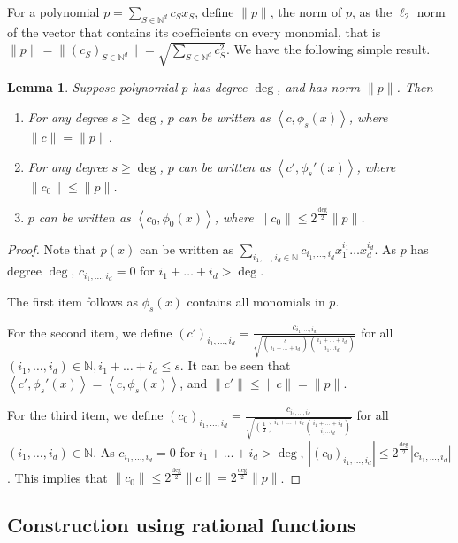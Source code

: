 \documentclass{article}
\newcommand{\field}[1]{\mathbb{#1}}
\newcommand{\fN}{\field{N}}
\newcommand{\inner}[1]{ \left\langle {#1} \right\rangle }
\newtheorem{lemma}[theorem]{Lemma}
\begin{document}
For a polynomial $p = \sum_{S \in \fN^d} c_S x_S$, define $\|p\|$, the norm of $p$, as the $\ell_2$ norm of the vector that contains its coefficients on every monomial, that is $\|p\| = \| (c_S)_{S \in \fN^d} \| = \sqrt{\sum_{S \in \fN^d} c_S^2}$. We have the following simple result.
\begin{lemma}
Suppose polynomial $p$ has degree $\deg$, and has norm $\|p\|$. Then
\begin{enumerate}
\item For any degree $s \geq \deg$, $p$ can be written as $\inner{c, \phi_s(x)}$, where $\|c\| = \|p\|$.
\item For any degree $s \geq \deg$, $p$ can be written as $\inner{c', \phi_s'(x)}$, where $\|c_0\| \leq \|p\|$.
\item $p$ can be written as $\inner{c_0, \phi_0(x)}$, where $\|c_0\| \leq 2^{\frac{\deg}{2}} \|p\|$.
\end{enumerate}
\end{lemma}
\begin{proof}
Note that $p(x)$ can be written as $\sum_{i_1,\ldots,i_d \in \fN} c_{i_1,\ldots,i_d} x_1^{i_1} \ldots x_d^{i_d}$. As $p$ has degree $\deg$, $c_{i_1,\ldots,i_d} = 0$ for $i_1 + \ldots + i_d > \deg$.

The first item follows as $\phi_s(x)$ contains all monomials in $p$.

For the second item, we define $(c')_{i_1,\ldots,i_d} = \frac{c_{i_1,\ldots,i_d}}{\sqrt{ {s \choose i_1+\ldots+i_d} {i_1+\ldots+i_d \choose i_1 \ldots i_d}}}$ for all $(i_1,\ldots,i_d) \in \fN, i_1+\ldots+i_d \leq s$. It can be seen that $\inner{c', \phi_s'(x)} = \inner{c, \phi_s(x)}$, and
$\| c' \| \leq \| c \| = \| p \|$.

For the third item, we define $(c_0)_{i_1,\ldots,i_d} = \frac{c_{i_1,\ldots,i_d}}{\sqrt{ (\frac 1 2)^{i_1+\ldots+i_d} {i_1+\ldots+i_d \choose i_1 \ldots i_d}}}$ for all $(i_1,\ldots,i_d) \in \fN$. As $c_{i_1,\ldots,i_d} = 0$ for $i_1 + \ldots + i_d > \deg$, $|(c_0)_{i_1,\ldots,i_d}| \leq 2^{\frac{\deg}{2}} |c_{i_1,\ldots,i_d}|$.
This implies that
$\| c_0 \| \leq 2^{\frac{\deg}{2}} \| c \| = 2^{\frac{\deg}{2}} \| p \| $.
\end{proof}




\subsection{Construction using rational functions}
\end{document}
